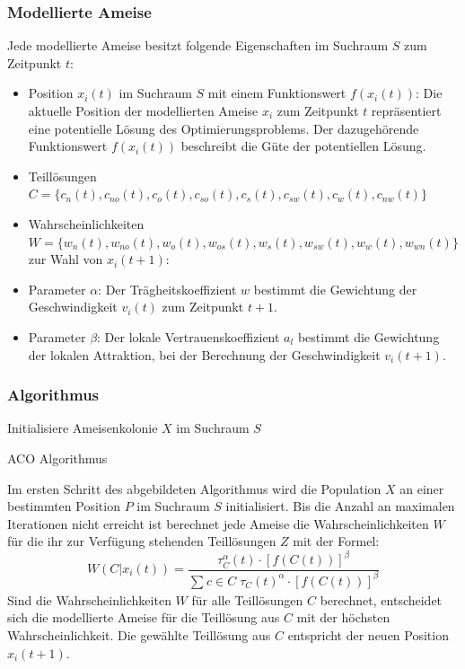 \documentclass[a4paper, 11pt]{article}
\begin{document}
\subsubsection{Modellierte Ameise}
Jede modellierte Ameise besitzt folgende Eigenschaften im Suchraum $S$ zum Zeitpunkt $t$:
\begin{itemize}
	\item Position $x_{i}(t)$ im Suchraum $S$ mit einem Funktionswert $f(x_{i}(t))$: Die aktuelle Position der modellierten Ameise $x_{i}$ zum Zeitpunkt $t$ repräsentiert eine potentielle Lösung des Optimierungsproblems. Der dazugehörende Funktionswert $f(x_{i}(t))$ beschreibt die Güte der potentiellen Lösung.
	\item Teillösungen $C=\{c_{n}(t),c_{no}(t),c_{o}(t),c_{so}(t),c_{s}(t),c_{sw}(t),c_{w}(t),c_{nw}(t)\}$
	\item Wahrscheinlichkeiten $W=\{w_{n}(t),w_{no}(t),w_{o}(t),w_{os}(t),w_{s}(t),w_{sw}(t),w_{w}(t),w_{wn}(t)\}$  zur Wahl von $x_{i}(t+1)$: 	
	\item Parameter $\alpha$: Der Trägheitskoeffizient $w$ bestimmt die Gewichtung der Geschwindigkeit $v_{i}(t)$ zum Zeitpunkt $t+1$.
	\item Parameter $\beta$: Der lokale Vertrauenskoeffizient $a_{l}$ bestimmt die Gewichtung der lokalen Attraktion, bei der Berechnung der Geschwindigkeit $v_{i}(t+1)$.
\end{itemize}
\subsubsection{Algorithmus}
\begin{framed}
	\begin{algorithm}[H]
		Initialisiere Ameisenkolonie $X$ im Suchraum $S$\;
		\caption{\acs{ACO} Algorithmus}
		\label{acoalgo}
	\end{algorithm}
\end{framed}
Im ersten Schritt des abgebildeten Algorithmus wird die Population $X$ an einer bestimmten Position $P$ im Suchraum $S$ initialisiert. Bis die Anzahl an maximalen Iterationen nicht erreicht ist berechnet jede Ameise die Wahrscheinlichkeiten $W$ für die ihr zur Verfügung stehenden Teillösungen $Z$ mit der Formel:
\begin{equation}
W(C|x_{i}(t)) = \frac{\tau_{C}^\alpha(t) \cdot [f(C(t))]^\beta}{\sum_{} c \in C\; \tau_{C}(t)^\alpha \cdot [f(C(t))]^\beta}
\end{equation}
Sind die Wahrscheinlichkeiten $W$ für alle Teillösungen $C$ berechnet, entscheidet sich die modellierte Ameise für die Teillösung aus $C$ mit der höchsten Wahrscheinlichkeit.
Die gewählte Teillösung aus $C$ entspricht der neuen Position $x_{i}(t+1)$.
\end{document}
